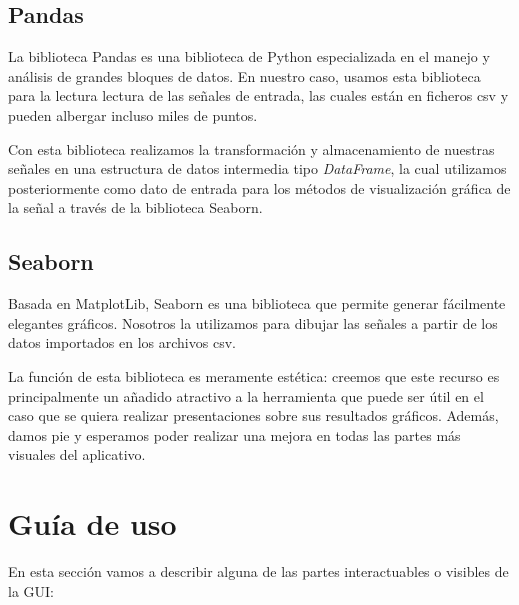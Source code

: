 
 
\subsection{Pandas}
La biblioteca Pandas es una biblioteca de Python especializada en el manejo y análisis de grandes bloques de datos. En nuestro caso, usamos esta biblioteca para la lectura lectura de las señales de entrada, las cuales están en ficheros csv y pueden albergar incluso miles de puntos.

Con esta biblioteca realizamos la transformación y almacenamiento de nuestras señales en una estructura de datos intermedia tipo \textit{DataFrame}, la cual utilizamos posteriormente como dato de entrada para los métodos de visualización gráfica de la señal a través de la biblioteca Seaborn. 
 
 

\subsection{Seaborn} 
Basada en MatplotLib, Seaborn es una biblioteca que permite generar fácilmente elegantes gráficos. Nosotros la utilizamos para dibujar las señales a partir de los datos importados en los archivos csv.

La función de esta biblioteca es meramente estética: creemos que este recurso es principalmente un añadido atractivo a la herramienta que puede ser útil en el caso que se quiera realizar presentaciones sobre sus resultados gráficos. Además, damos pie y esperamos poder realizar una mejora en todas las partes más visuales del aplicativo. 
 
 

\section{Guía de uso}
En esta sección vamos a describir alguna de las partes interactuables o visibles de la GUI:

